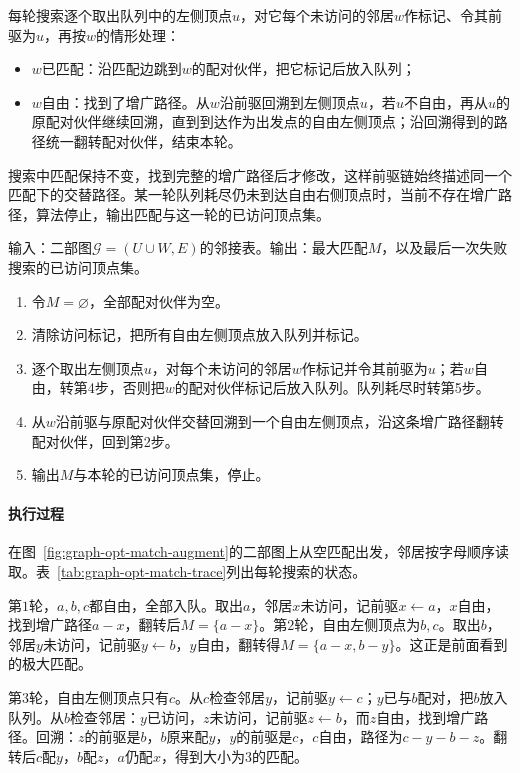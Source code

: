 每轮搜索逐个取出队列中的左侧顶点$u$，对它每个未访问的邻居$w$作标记、令其前驱为$u$，再按$w$的情形处理：
\begin{itemize}
  \item $w$已匹配：沿匹配边跳到$w$的配对伙伴，把它标记后放入队列；
  \item $w$自由：找到了增广路径。从$w$沿前驱回溯到左侧顶点$u$，若$u$不自由，再从$u$的原配对伙伴继续回溯，直到到达作为出发点的自由左侧顶点；沿回溯得到的路径统一翻转配对伙伴，结束本轮。
\end{itemize}
搜索中匹配保持不变，找到完整的增广路径后才修改，这样前驱链始终描述同一个匹配下的交替路径。某一轮队列耗尽仍未到达自由右侧顶点时，当前不存在增广路径，算法停止，输出匹配与这一轮的已访问顶点集。

\begin{algorithm}[增广匹配]
\label{alg:graph-opt-augmenting-matching}
输入：二部图$\mathcal G=(U\cup W,E)$的邻接表。输出：最大匹配$M$，以及最后一次失败搜索的已访问顶点集。
\begin{enumerate}
  \item 令$M=\varnothing$，全部配对伙伴为空。
  \item 清除访问标记，把所有自由左侧顶点放入队列并标记。
  \item 逐个取出左侧顶点$u$，对每个未访问的邻居$w$作标记并令其前驱为$u$；若$w$自由，转第4步，否则把$w$的配对伙伴标记后放入队列。队列耗尽时转第5步。
  \item 从$w$沿前驱与原配对伙伴交替回溯到一个自由左侧顶点，沿这条增广路径翻转配对伙伴，回到第2步。
  \item 输出$M$与本轮的已访问顶点集，停止。
\end{enumerate}
\end{algorithm}

\paragraph{执行过程}
在图~\ref{fig:graph-opt-match-augment}的二部图上从空匹配出发，邻居按字母顺序读取。表~\ref{tab:graph-opt-match-trace}列出每轮搜索的状态。

第$1$轮，$a,b,c$都自由，全部入队。取出$a$，邻居$x$未访问，记前驱$x\leftarrow a$，$x$自由，找到增广路径$a-x$，翻转后$M=\{a-x\}$。第$2$轮，自由左侧顶点为$b,c$。取出$b$，邻居$y$未访问，记前驱$y\leftarrow b$，$y$自由，翻转得$M=\{a-x,b-y\}$。这正是前面看到的极大匹配。

第$3$轮，自由左侧顶点只有$c$。从$c$检查邻居$y$，记前驱$y\leftarrow c$；$y$已与$b$配对，把$b$放入队列。从$b$检查邻居：$y$已访问，$z$未访问，记前驱$z\leftarrow b$，而$z$自由，找到增广路径。回溯：$z$的前驱是$b$，$b$原来配$y$，$y$的前驱是$c$，$c$自由，路径为$c-y-b-z$。翻转后$c$配$y$，$b$配$z$，$a$仍配$x$，得到大小为$3$的匹配。


